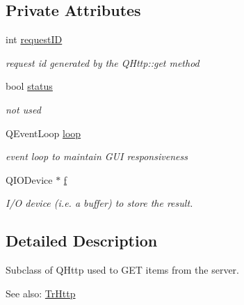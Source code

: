 \subsection*{Private Attributes}
\begin{CompactItemize}
\item 
\hypertarget{classHttpGet_39c8647e213dcf8ddab15ad8f9614d09}{
int \hyperlink{classHttpGet_39c8647e213dcf8ddab15ad8f9614d09}{requestID}}
\label{classHttpGet_39c8647e213dcf8ddab15ad8f9614d09}

\begin{CompactList}\small\item\em request id generated by the QHttp::get method \item\end{CompactList}\item 
\hypertarget{classHttpGet_bd56ad9d0c67c9c3897c402cbb0bf6dd}{
bool \hyperlink{classHttpGet_bd56ad9d0c67c9c3897c402cbb0bf6dd}{status}}
\label{classHttpGet_bd56ad9d0c67c9c3897c402cbb0bf6dd}

\begin{CompactList}\small\item\em not used \item\end{CompactList}\item 
\hypertarget{classHttpGet_911e04d431ef6c5da21cc0b2a62f5ed1}{
QEventLoop \hyperlink{classHttpGet_911e04d431ef6c5da21cc0b2a62f5ed1}{loop}}
\label{classHttpGet_911e04d431ef6c5da21cc0b2a62f5ed1}

\begin{CompactList}\small\item\em event loop to maintain GUI responsiveness \item\end{CompactList}\item 
\hypertarget{classHttpGet_cade879d3d9865ed02e758f923981299}{
QIODevice $\ast$ \hyperlink{classHttpGet_cade879d3d9865ed02e758f923981299}{f}}
\label{classHttpGet_cade879d3d9865ed02e758f923981299}

\begin{CompactList}\small\item\em I/O device (i.e. a buffer) to store the result. \item\end{CompactList}\end{CompactItemize}


\subsection{Detailed Description}
Subclass of QHttp used to GET items from the server. \begin{Desc}
\item[See also:]\hyperlink{classTrHttp}{TrHttp} \end{Desc}


